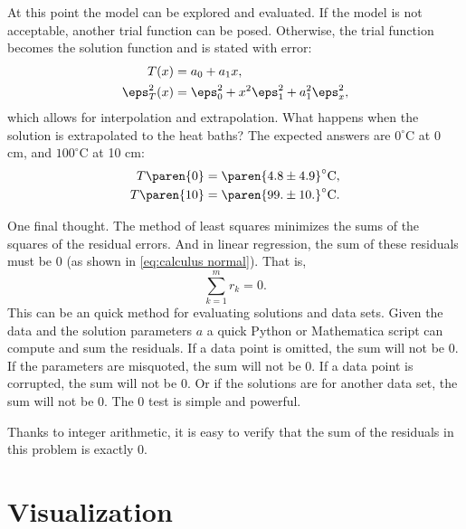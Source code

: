 At this point the model can be explored and evaluated. If the model is not acceptable, another trial function can be posed. Otherwise, the trial function becomes the solution function and is stated with error:
  \begin{equation*}   %
  \begin{split}
    T(x)         & = a_{0} + a_{1} x, \\
    \eps_{T}^{2}(x) & = \eps_{0}^{2} + x^{2} \eps_{1}^{2} + a_{1}^{2} \eps_{x}^{2} , \\
  \end{split}
  \end{equation*}
which allows for interpolation and extrapolation. What happens when the solution is extrapolated to the heat baths? The expected answers are $0^{\circ}$C at 0 cm, and $100^{\circ}$C at 10 cm:
  \begin{equation*}   %
  \begin{split}
      T \paren{0}  &= \paren{ 4.8 \pm 4.9 }^{\circ}\mathrm{C}, \\
      T \paren{10} &= \paren{ 99. \pm 10. }^{\circ}\mathrm{C}.
  \end{split}
  \end{equation*}
  
One final thought. The method of least squares minimizes the sums of the squares of the residual errors. And in linear regression, the sum of these residuals must be 0 (as shown in \eqref{eq:calculus normal}). That is,
  \begin{equation*}   %
    \sum_{k=1}^{m} r_{k} = 0 .
  \end{equation*}
This can be an quick method for evaluating solutions and data sets. Given the data and the solution parameters $a$ a quick Python or Mathematica script can compute and sum the residuals. If a data point is omitted, the sum will not be 0. If the parameters are misquoted, the sum will not be 0. If a data point is corrupted, the sum will not be 0. Or if the solutions are for another data set, the sum will not be 0. The 0 test is simple and powerful.

Thanks to integer arithmetic, it is easy to verify that the sum of the residuals in this problem is exactly 0.

\section{Visualization}  %

